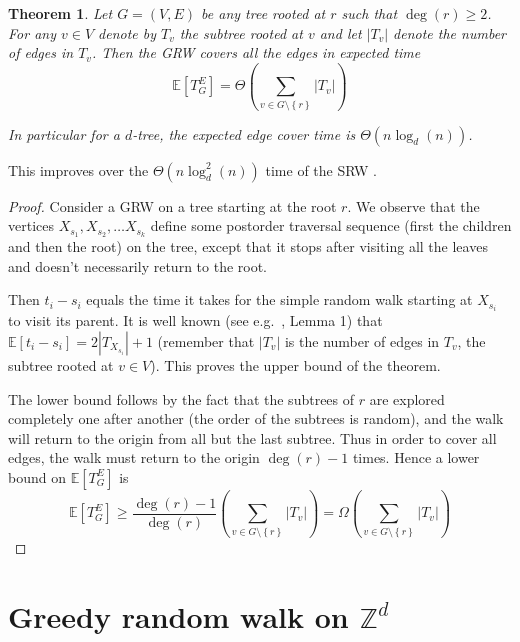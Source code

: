 \documentclass[12pt,a4paper]{article}
\newcommand{\set}[1]{{\left\{#1 \right\}}}
\newcommand{\0}{{\bf 0}}
\newcommand{\Z}{{\mathbb Z}}
\newcommand{\E}{{\mathbb E}}
\newtheorem{theorem}{Theorem}[section]
\begin{document}
    \begin{theorem}\label{thm:trees}
        Let $G = (V,E)$ be any tree rooted at $r$ such that $\deg(r) \geq 2$.
        For any $v \in V$ denote by $T_v$ the subtree rooted at $v$
        and let $|T_v|$ denote the number of edges in $T_v$.
        Then the GRW covers all the edges in expected time
        \[
            \E[T^E_G] = \Theta \left( \sum_{v \in G \setminus \set{r}} |T_v| \right)
        \]

        In particular for a $d$-tree, the expected edge cover time is $\Theta(n \log_d(n))$.
    \end{theorem}
    This improves over the $\Theta (n \log^2_d(n) )$ time of the SRW \cite{aldous1991random}.
    \begin{proof}
        Consider a GRW on a tree starting at the root $r$.
        We observe that the vertices $X_{s_1},X_{s_2},\dots X_{s_k}$ define some postorder traversal sequence (first the children and then the root)
        on the tree, except that it stops after visiting all the leaves and doesn't necessarily return to the root.

        Then $t_i - s_i$ equals the time it takes for the simple random walk starting at $X_{s_i}$ to visit its parent.
        It is well known (see e.g.\ \cite{AKLLR79}, Lemma 1) that $\E[t_i - s_i] = 2|T_{X_{s_i}}| + 1$ (remember that
        $|T_v|$ is the number of edges in $T_v$, the subtree rooted at $v \in V$).
        This proves the upper bound of the theorem.

        The lower bound follows by the fact that the subtrees of $r$
        are explored completely one after another (the order of the subtrees is random),
        and the walk will return to the origin from all but the last subtree.
        Thus in order to cover all edges, the walk must return to the origin $\deg(r) - 1$ times.
        Hence a lower bound on $\E[T^E_G]$ is
        \[
            \E[T^E_G] \geq \frac{\deg(r)-1}{\deg(r)} \left( \sum_{v \in G \setminus \set{r}} |T_v| \right)
                = \Omega \left( \sum_{v \in G \setminus \set{r}} |T_v| \right)
        \]
    \end{proof}
\section{Greedy random walk on $\Z^d$}\label{sec:z^d}
\end{document}
